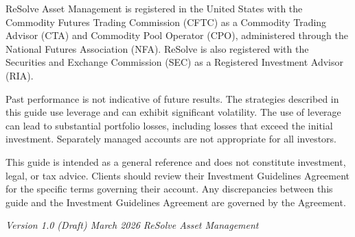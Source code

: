 \documentclass{resolve-whitepaper}
\begin{document}
\begin{disclosurebody}

ReSolve Asset Management is registered in the United States with the
Commodity Futures Trading Commission (CFTC) as a Commodity Trading
Advisor (CTA) and Commodity Pool Operator (CPO), administered through
the National Futures Association (NFA). ReSolve is also registered with
the Securities and Exchange Commission (SEC) as a Registered Investment
Advisor (RIA).

Past performance is not indicative of future results. The strategies
described in this guide use leverage and can exhibit significant
volatility. The use of leverage can lead to substantial portfolio
losses, including losses that exceed the initial investment. Separately
managed accounts are not appropriate for all investors.

This guide is intended as a general reference and does not constitute
investment, legal, or tax advice. Clients should review their Investment
Guidelines Agreement for the specific terms governing their account. Any
discrepancies between this guide and the Investment Guidelines Agreement
are governed by the Agreement.

\emph{Version 1.0 (Draft) \textbar{} March 2026 \textbar{} ReSolve Asset
Management}

\end{disclosurebody}
\end{document}

